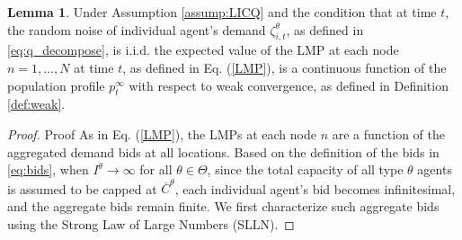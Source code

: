\documentclass{article}
\theoremstyle{definition}
\newtheorem{lemma}{Lemma}
\theoremstyle{plain}
\begin{document}
\begin{lemma}
	Under Assumption \ref{assump:LICQ} and the condition that at time $t$, the random noise of individual agent's demand \(\zeta^{\theta}_{i,t}\), as defined in \eqref{eq:q_decompose}, is i.i.d. 
    the expected value of the LMP at each node \(n = 1, \ldots, N\) at time \(t\), as defined in Eq. (\ref{LMP}), is a continuous function of the population profile \(p^{\infty}_{t}\) with respect to weak convergence, as defined in Definition \ref{def:weak}.
	\label{lemma:ELMP}
\end{lemma}
\begin{proof}{Proof} As in Eq. (\ref{LMP}), the LMPs at each node $n$ are a function of the aggregated demand bids at all locations. Based on the definition of the bids in \eqref{eq:bids}, when $I^{\theta} \to \infty$ for all \(\theta \in \Theta\), since the total capacity of all type $\theta$ agents is assumed to be capped at $\overline{C}^{\theta}$, each individual agent's bid becomes infinitesimal, and the aggregate bids remain finite. We first characterize such aggregate bids using the Strong Law of Large Numbers (SLLN).  


\end{proof}
\end{document}
